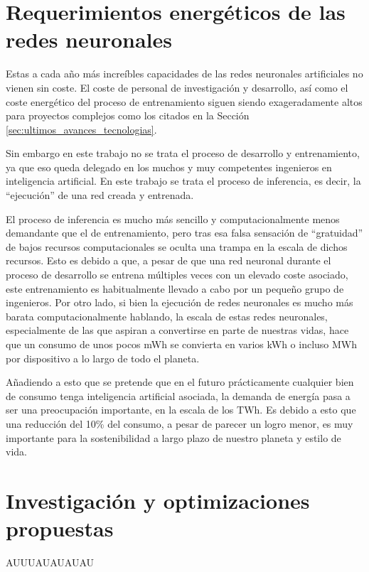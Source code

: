 \section{Requerimientos energéticos de las redes neuronales}
\label{sec:requerimientos_energeticos_redes_neuronales}
Estas a cada año más increíbles capacidades de las redes neuronales artificiales no vienen sin coste. El coste de personal de investigación y desarrollo, así como el coste energético del proceso de entrenamiento siguen siendo exageradamente altos para proyectos complejos como los citados en la Sección \ref{sec:ultimos_avances_tecnologias}.

Sin embargo en este trabajo no se trata el proceso de desarrollo y entrenamiento, ya que eso queda delegado en los muchos y muy competentes ingenieros en inteligencia artificial. En este trabajo se trata el proceso de inferencia, es decir, la ``ejecución'' de una red creada y entrenada.

El proceso de inferencia es mucho más sencillo y computacionalmente menos demandante que el de entrenamiento, pero tras esa falsa sensación de ``gratuidad'' de bajos recursos computacionales se oculta una trampa en la escala de dichos recursos. Esto es debido a que, a pesar de que una red neuronal durante el proceso de desarrollo se entrena múltiples veces con un elevado coste asociado, este entrenamiento es habitualmente llevado a cabo por un pequeño grupo de ingenieros. Por otro lado, si bien la ejecución de redes neuronales es mucho más barata computacionalmente hablando, la escala de estas redes neuronales, especialmente de las que aspiran a convertirse en parte de nuestras vidas, hace que un consumo de unos pocos mWh se convierta en varios kWh o incluso MWh por dispositivo a lo largo de todo el planeta.

Añadiendo a esto que se pretende que en el futuro prácticamente cualquier bien de consumo tenga inteligencia artificial asociada, la demanda de energía pasa a ser una preocupación importante, en la escala de los TWh. Es debido a esto que una reducción del 10\% del consumo, a pesar de parecer un logro menor, es muy importante para la sostenibilidad a largo plazo de nuestro planeta y estilo de vida.

\section{Investigación y optimizaciones propuestas}
\label{sec:investigacion_optimizaciones_propuestas}
AUUUAUAUAUAU